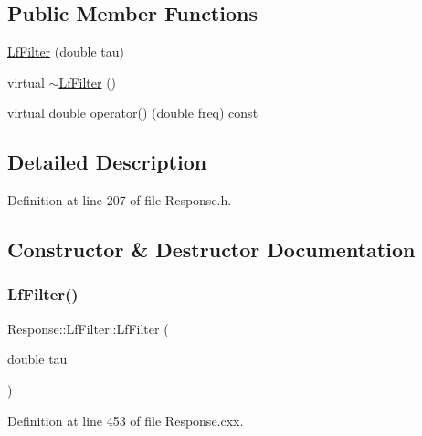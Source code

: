 \subsection*{Public Member Functions}
\begin{DoxyCompactItemize}
\item 
\hyperlink{class_wire_cell_1_1_response_1_1_lf_filter_a0f3577062ba73ff360954258b916b72a}{Lf\+Filter} (double tau)
\item 
virtual \hyperlink{class_wire_cell_1_1_response_1_1_lf_filter_ae6d9f9d41e89430af1aa534c966d55af}{$\sim$\+Lf\+Filter} ()
\item 
virtual double \hyperlink{class_wire_cell_1_1_response_1_1_lf_filter_a476aa965cb6af0ba6dada07d6558c856}{operator()} (double freq) const
\end{DoxyCompactItemize}


\subsection{Detailed Description}


Definition at line 207 of file Response.\+h.



\subsection{Constructor \& Destructor Documentation}
\mbox{\label{class_wire_cell_1_1_response_1_1_lf_filter_a0f3577062ba73ff360954258b916b72a}} 
\subsubsection{\texorpdfstring{Lf\+Filter()}{LfFilter()}}
{\footnotesize\ttfamily Response\+::\+Lf\+Filter\+::\+Lf\+Filter (\begin{DoxyParamCaption}\item[{double}]{tau }\end{DoxyParamCaption})}



Definition at line 453 of file Response.\+cxx.

\mbox{\label{class_wire_cell_1_1_response_1_1_lf_filter_ae6d9f9d41e89430af1aa534c966d55af}} 
